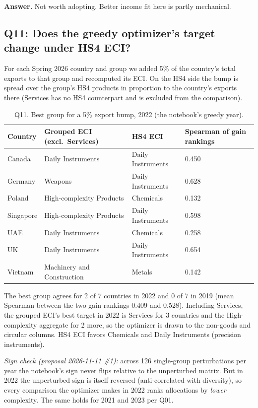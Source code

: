 \documentclass[11pt]{article}
\begin{document}
\textbf{Answer.} Not worth adopting. Better income fit here is partly mechanical.

\subsection{Q11: Does the greedy optimizer's target change under HS4 ECI?}\label{sec:q11}

For each Spring 2026 country and group we added 5\% of the country's total exports to that group and recomputed its ECI. On the HS4 side the bump is spread over the group's HS4 products in proportion to the country's exports there (Services has no HS4 counterpart and is excluded from the comparison).

\begin{table}[H]\centering\small
\caption{Q11. Best group for a 5\% export bump, 2022 (the notebook's greedy year).}\label{tab:q11}
\begin{tabular}{llll}
\toprule
Country & Grouped ECI (excl.\ Services) & HS4 ECI & Spearman of gain rankings \\
\midrule
Canada & Daily Instruments & Daily Instruments & 0.450 \\
Germany & Weapons & Daily Instruments & 0.628 \\
Poland & High-complexity Products & Chemicals & 0.132 \\
Singapore & High-complexity Products & Daily Instruments & 0.598 \\
UAE & Daily Instruments & Chemicals & 0.258 \\
UK & Daily Instruments & Daily Instruments & 0.654 \\
Vietnam & Machinery and Construction & Metals & 0.142 \\
\bottomrule
\end{tabular}
\end{table}

The best group agrees for 2 of 7 countries in 2022 and 0 of 7 in 2019 (mean Spearman between the two gain rankings 0.409 and 0.528). Including Services, the grouped ECI's best target in 2022 is Services for 3 countries and the High-complexity aggregate for 2 more, so the optimizer is drawn to the non-goods and circular columns. HS4 ECI favors Chemicals and Daily Instruments (precision instruments).

\emph{Sign check (proposal 2026-11-11 \#1):} across 126 single-group perturbations per year the notebook's sign never flips relative to the unperturbed matrix. But in 2022 the unperturbed sign is itself reversed (anti-correlated with diversity), so every comparison the optimizer makes in 2022 ranks allocations by \emph{lower} complexity. The same holds for 2021 and 2023 per Q01.
\end{document}
